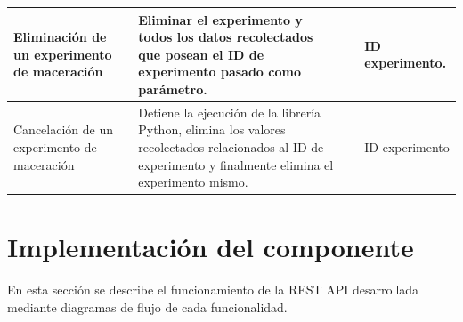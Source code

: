 \begin{longtable}{|p{2.2cm}|p{4.8cm}|p{3.5cm}|p{3.5cm}|}
            Eliminación de un experimento de maceración & Eliminar el experimento y todos los datos recolectados que posean el ID de experimento pasado como parámetro. &  & ID experimento.\\
            \hline
                    
            Cancelación de un experimento de maceración & Detiene la ejecución de la librería Python, elimina los valores recolectados relacionados al ID de experimento y finalmente elimina el experimento mismo. & & ID experimento\\
            \hline
            
\end{longtable}     
  
    \section{Implementación del componente}
        \par En esta sección se describe el funcionamiento de la REST API desarrollada mediante diagramas de flujo de cada funcionalidad.
        

